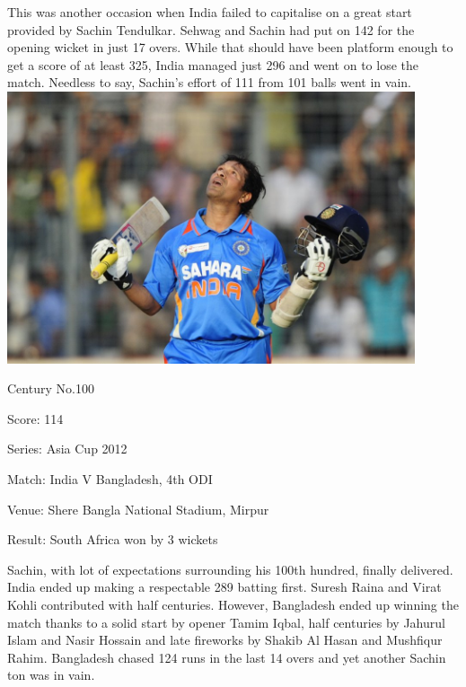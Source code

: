 \documentclass[11pt, a4paper]{article}
\begin{document}
This was another occasion when India failed to capitalise on a great start provided by Sachin Tendulkar. Sehwag and Sachin had put on 142 for the opening wicket in just 17 overs. While that should have been platform enough to get a score of at least 325, India managed just 296 and went on to lose the match. Needless to say, Sachin's effort of 111 from 101 balls went in vain.
\newpage
\includegraphics[width=0.9\textwidth]{pics/100.jpg}

Century No.100 

Score: 114 

Series: Asia Cup 2012 

Match: India V Bangladesh, 4th ODI 

Venue: Shere Bangla National Stadium, Mirpur 

Result: South Africa won by 3 wickets 

Sachin, with lot of expectations surrounding his 100th hundred, finally delivered. India ended up making a respectable 289 batting first. Suresh Raina and Virat Kohli contributed with half centuries. However, Bangladesh ended up winning the match thanks to a solid start by opener Tamim Iqbal, half centuries by Jahurul Islam and Nasir Hossain and late fireworks by Shakib Al Hasan and Mushfiqur Rahim. Bangladesh chased 124 runs in the last 14 overs and yet another Sachin ton was in vain.
\end{document}
